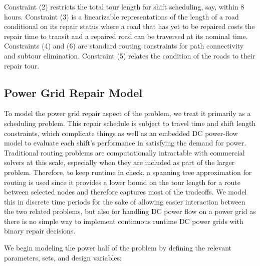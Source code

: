 \documentclass[10pt]{article}
\begin{document}
Constraint (2) restricts the total tour length for shift scheduling, say, within 8 hours. Constraint (3) is a linearizable representations of the length of a road conditional on its repair status where a road that has yet to be repaired costs the repair time to transit and a repaired road can be traversed at its nominal time. Constraints (4) and (6) are standard routing constraints for path connectivity and subtour elimination. Constraint (5) relates the condition of the roads to their repair tour.


\subsection{Power Grid Repair Model}
\vspace*{-12pt}
To model the power grid repair aspect of the problem, we treat it primarily as a scheduling problem. This repair schedule is subject to travel time and shift length constraints, which complicate things as well as an embedded DC power-flow model to evaluate each shift's performance in satisfying the demand for power. Traditional routing problems are computationally intractable with commercial solvers at this scale, especially when they are included as part of the larger problem. Therefore, to keep runtime in check, a spanning tree approximation for routing is used since it provides a lower bound on the tour length for a route between selected nodes and therefore captures most of the tradeoffs. We model this in discrete time periods for the sake of allowing easier interaction between the two related problems, but also for handling DC power flow on a power grid as there is no simple way to implement continuous runtime DC power grids with binary repair decisions.

We begin modeling the power half of the problem by defining the relevant parameters, sets, and design variables:
\end{document}
